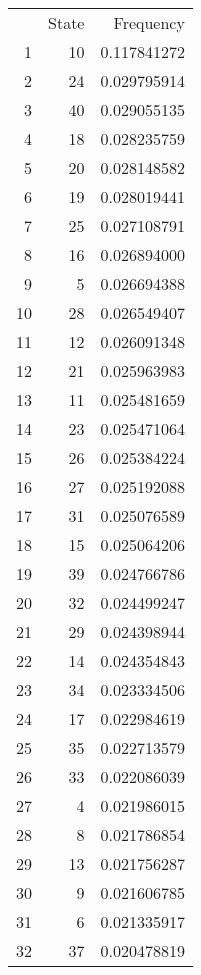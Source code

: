 \documentclass[12pt]{article}
\begin{document}
\begin{table}
    \centering
    \begin{tabular}{rrr}
           & State & Frequency   \\ 
        1  & 10    & 0.117841272 \\ 
        2  & 24    & 0.029795914 \\ 
        3  & 40    & 0.029055135 \\ 
        4  & 18    & 0.028235759 \\ 
        5  & 20    & 0.028148582 \\ 
        6  & 19    & 0.028019441 \\ 
        7  & 25    & 0.027108791 \\ 
        8  & 16    & 0.026894000 \\ 
        9  & 5     & 0.026694388 \\ 
        10 & 28    & 0.026549407 \\ 
        11 & 12    & 0.026091348 \\ 
        12 & 21    & 0.025963983 \\ 
        13 & 11    & 0.025481659 \\ 
        14 & 23    & 0.025471064 \\ 
        15 & 26    & 0.025384224 \\ 
        16 & 27    & 0.025192088 \\ 
        17 & 31    & 0.025076589 \\ 
        18 & 15    & 0.025064206 \\ 
        19 & 39    & 0.024766786 \\ 
        20 & 32    & 0.024499247 \\ 
        21 & 29    & 0.024398944 \\ 
        22 & 14    & 0.024354843 \\ 
        23 & 34    & 0.023334506 \\ 
        24 & 17    & 0.022984619 \\ 
        25 & 35    & 0.022713579 \\ 
        26 & 33    & 0.022086039 \\ 
        27 & 4     & 0.021986015 \\ 
        28 & 8     & 0.021786854 \\ 
        29 & 13    & 0.021756287 \\ 
        30 & 9     & 0.021606785 \\ 
        31 & 6     & 0.021335917 \\ 
        32 & 37    & 0.020478819 \\ 

\end{tabular}
\end{table}
\end{document}
